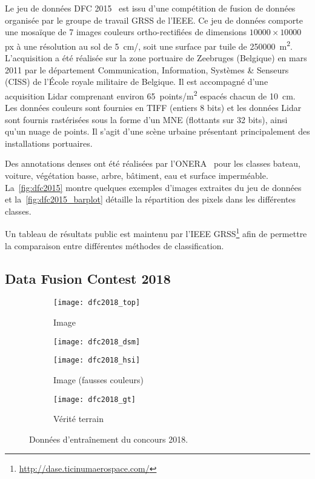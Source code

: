 Le jeu de données \gls{DFC} 2015~\cite{campos-taberner_processing_2016} est issu d'une compétition de fusion de données organisée par le groupe de travail \gls{GRSS} de l'\gls{IEEE}. Ce jeu de données comporte une mosaïque de 7 images couleurs ortho-rectifiées de dimensions $10 000\times10 000$px à une résolution au sol de \SI{5}{\centi\meter/\px}, soit une surface par tuile de \SI{250 000}{\meter\squared}. L'acquisition a été réalisée sur la zone portuaire de Zeebruges (Belgique) en mars 2011 par le département Communication, Information, Systèmes \& Senseurs (CISS) de l'École royale militaire de Belgique. Il est accompagné d'une acquisition \gls{Lidar} comprenant environ \SI{65}{points/\meter\squared} espacés chacun de \SI{10}{\centi\meter}. Les données couleurs sont fournies en \gls{TIFF} (entiers 8 bits) et les données \gls{Lidar} sont fournis rastérisées sous la forme d'un \gls{MNE} (flottants sur 32 bits), ainsi qu'un nuage de points. Il s'agit d'une scène urbaine présentant principalement des installations portuaires.

 Des annotations denses ont été réalisées par l'\gls{ONERA}~\cite{lagrange_benchmarking_2015} pour les classes bateau, voiture, végétation basse, arbre, bâtiment, eau et surface imperméable. La~\cref{fig:dfc2015} montre quelques exemples d'images extraites du jeu de données et la~\cref{fig:dfc2015_barplot} détaille la répartition des pixels dans les différentes classes.

Un tableau de résultats public est maintenu par l'\gls{IEEE} \gls{GRSS}\footnote{\url{http://dase.ticinumaerospace.com/}} afin de permettre la comparaison entre différentes méthodes de classification.

\subsection{Data Fusion Contest 2018}
\label{annexe:dfc2018}

\begin{figure}[!t]
  \begin{subfigure}{\textwidth}
    \texttt{[image: dfc2018\_top]}
    \caption{Image }
  \end{subfigure}
  \begin{subfigure}{\textwidth}
    \texttt{[image: dfc2018\_dsm]}
    \caption{}
  \end{subfigure}
  \begin{subfigure}{\textwidth}
    \texttt{[image: dfc2018\_hsi]}
    \caption{Image  (fausses couleurs)}
  \end{subfigure}
  \begin{subfigure}{\textwidth}
    \texttt{[image: dfc2018\_gt]}
    \caption{Vérité terrain}
  \end{subfigure}
  \caption{Données d'entraînement du concours  2018.}
  \label{fig:dfc2018}
\end{figure}

